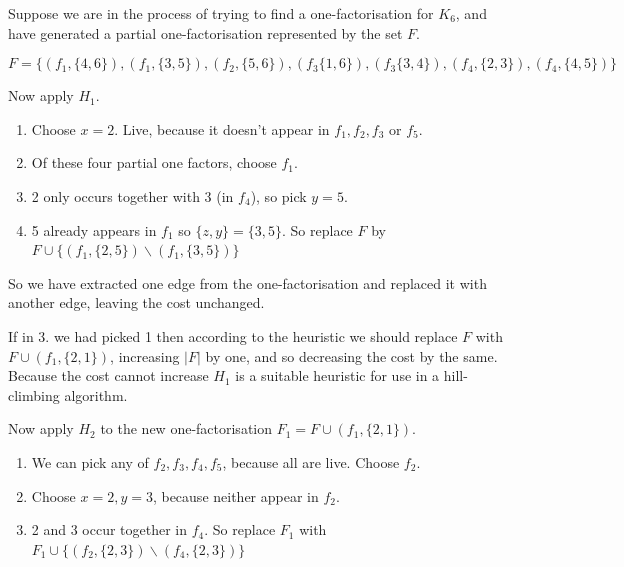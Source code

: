 \documentclass[
  11pt,
  a4paper]{book}
\begin{document}
\begin{algorithm}[H]
\caption{$H_2$}
\end{algorithm}

Suppose we are in the process of trying to find a one-factorisation for
\(K_6\), and have generated a partial one-factorisation represented by
the set \(F\).

\begin{equation*}
F = \{(f_1,\{4,6\}),(f_1,\{3,5\}),(f_2,\{5,6\}),(f_3\{1,6\}), (f_3\{3,4\}),(f_4,\{2,3\}),(f_4,\{4,5\})\}
\end{equation*}

Now apply \(H_1\).

\begin{enumerate}
\def\labelenumi{\arabic{enumi}.}
\item
  Choose \(x = 2\). Live, because it doesn't appear in \(f_1, f_2, f_3\)
  or \(f_5\).
\item
  Of these four partial one factors, choose \(f_1\).
\item
  2 only occurs together with 3 (in \(f_4\)), so pick \(y = 5\).
\item
  5 already appears in \(f_1\) so \(\{z, y\} = \{3, 5\}\). So replace
  \(F\) by \(F \cup \{(f_1, \{2, 5\}) \backslash (f_1, \{3, 5\})\}\)
\end{enumerate}

So we have extracted one edge from the one-factorisation and replaced it
with another edge, leaving the cost unchanged.

If in 3. we had picked 1 then according to the heuristic we should
replace \(F\) with \(F \cup (f_1, \{2, 1\})\), increasing \(|F|\) by
one, and so decreasing the cost by the same. Because the cost cannot
increase \(H_1\) is a suitable heuristic for use in a hill-climbing
algorithm.

Now apply \(H_2\) to the new one-factorisation
\(F_1 = F \cup (f_1, \{2, 1\})\).

\begin{enumerate}
\def\labelenumi{\arabic{enumi}.}
\item
  We can pick any of \(f_2, f_3, f_4, f_5\), because all are live.
  Choose \(f_2\).
\item
  Choose \(x = 2, y = 3\), because neither appear in \(f_2\).
\item
  2 and 3 occur together in \(f_4\). So replace \(F_1\) with
  \(F_1 \cup \{(f_2, \{2, 3\}) \backslash (f_4, \{2, 3\})\}\)
\end{enumerate}
\end{document}

